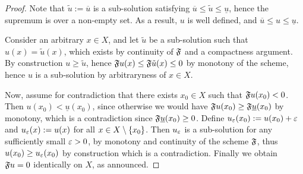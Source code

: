 \begin{proof}
Note that $\tilde u := \overline u$ is a sub-solution satisfying $\overline u \leq \tilde u \leq \underline u$, hence the supremum is over a non-empty set. 
As a result, $u$ is well defined, and $\overline u \leq u \leq \underline u$.

Consider an arbitrary $x\in X$, and let $\tilde u$ be a sub-solution such that $u(x)=\tilde u(x)$, which exists by continuity of $\mathfrak{F}$ and a compactness argument.
By construction $u \geq \tilde u$, hence $\mathfrak{F} u(x) \leq \mathfrak{F} \tilde u(x)\leq 0$ by monotony of the scheme, hence $u$ is a sub-solution by arbitraryness of $x\in X$. 

Now, assume for contradiction that there exists $x_0 \in X$ such that $\mathfrak{F} u(x_0) < 0$. Then $u(x_0)< \underline u(x_0)$, since otherwise we would have $\mathfrak{F} u(x_0) \geq \mathfrak{F}\underline u(x_0)$ by monotony, which is a contradiction since $\mathfrak{F}\underline u(x_0) \geq 0$. Define $u_\varepsilon(x_0):=u(x_0)+\varepsilon$ and $u_\varepsilon(x) := u(x)$ for all $x \in X\setminus \{x_0\}$. Then $u_\varepsilon$ is a sub-solution for any sufficiently small $\varepsilon>0$, by monotony and continuity of the scheme $\mathfrak{F}$, thus $u(x_0) \geq u_\varepsilon(x_0)$ by construction which is a contradiction. Finally we obtain $\mathfrak{F} u=0$ identically on $X$, as announced.
\end{proof}

